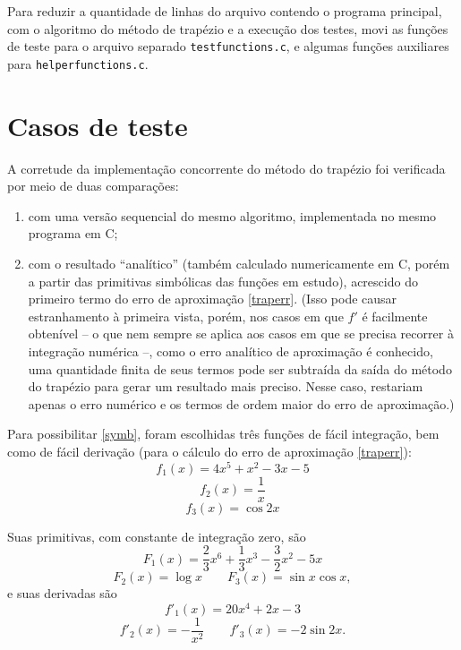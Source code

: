 \documentclass{article}
\begin{document}
  Para reduzir a quantidade de linhas do arquivo contendo o programa principal, com o algoritmo do método de trapézio e a execução dos testes, movi as funções de teste para o arquivo separado \texttt{testfunctions.c}, e algumas funções auxiliares para \texttt{helperfunctions.c}.

  \section{Casos de teste} \label{tests}

  A corretude da implementação concorrente do método do trapézio foi verificada por meio de duas comparações:
  
  \begin{enumerate}[label=(\roman*)]
    \item com uma versão sequencial do mesmo algoritmo, implementada no mesmo programa em C; \label{seq}
    
    \item com o resultado ``analítico'' (também calculado numericamente em C, porém a partir das primitivas simbólicas das funções em estudo), acrescido do primeiro termo do erro de aproximação \eqref{traperr}. (Isso pode causar estranhamento à primeira vista, porém, nos casos em que $f'$ é facilmente obtenível -- o que nem sempre se aplica aos casos em que se precisa recorrer à integração numérica --, como o erro analítico de aproximação é conhecido, uma quantidade finita de seus termos pode ser subtraída da saída do método do trapézio para gerar um resultado mais preciso. Nesse caso, restariam apenas o erro numérico e os termos de ordem maior do erro de aproximação.) \label{symb}
  \end{enumerate}
  
  Para possibilitar \ref{symb}, foram escolhidas três funções de fácil integração, bem como de fácil derivação (para o cálculo do erro de aproximação \eqref{traperr}):
  \begin{equation} \label{f1}
   f_1(x) = 4x^5 + x^2 - 3x - 5
  \end{equation}
  \begin{equation} \label{f2}
    f_2(x) = \frac{1}{x}
  \end{equation}
  \begin{equation} \label{f3}
    f_3(x) = \cos{2x}
  \end{equation}

  Suas primitivas, com constante de integração zero, são
  \begin{equation*}
    F_1(x) = \frac{2}{3} x^6 + \frac{1}{3} x^3 - \frac{3}{2} x^2 - 5x
  \end{equation*}
  \begin{equation*}
    F_2(x) = \log{x} \qquad F_3(x) = \sin{x}\cos{x},
  \end{equation*} \noindent
  e suas derivadas são
  \begin{equation*}
    f'_1(x) = 20x^4 + 2x - 3
  \end{equation*}
  \begin{equation*}
    f'_2(x) = -\frac{1}{x^2} \qquad f'_3(x) = -2\sin{2x}.
  \end{equation*}
\end{document}
